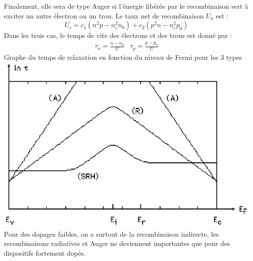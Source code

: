 Finalement, elle sera de type Auger si l'énergie libérée par le recombinaison sert à exciter un autre électron ou un trou. 
Le taux net de recombinaison $U_a$ est :
\begin{equation}
U_c=c_1(n^2p-n_i^2n_0)+c_2(p^2n-n_i^2p_0)
\end{equation}
Dans les trois cas, le temps de vite des électrons et des trous est donné par :
\begin{equation}
\begin{array}{cc}
\tau_n=\frac{n-n_0}{U} & \tau_p=\frac{p-p_0}{U} 
\end{array} 
\end{equation}
Graphe du temps de relaxation en fonction du niveau de Fermi pour les 3 types\\
\includegraphics[scale=1]{recomb.eps} \\
Pour des dopages faibles, on a surtout de la recombinaison indirecte, les recombinaisons radiatives et Auger ne deviennent importantes que pour des dispositifs fortement dopés.\\
